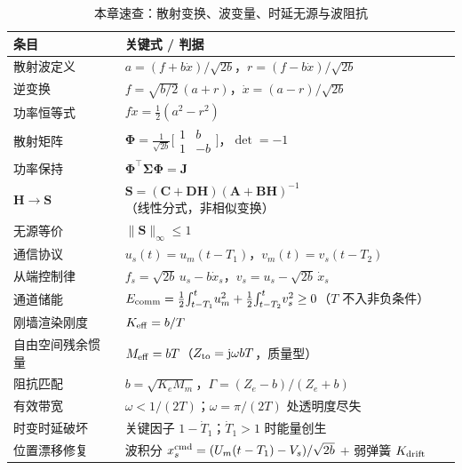 \begin{table}[H]\centering\small
\caption{本章速查：散射变换、波变量、时延无源与波阻抗}
\label{tab:tw-cheatsheet}
\begin{tabular}{p{} p{}}
\toprule
条目 & 关键式 / 判据 \\
\midrule
散射波定义 & $a=(f+b\dot x)/\sqrt{2b}$，$r=(f-b\dot x)/\sqrt{2b}$ \\
逆变换 & $f=\sqrt{b/2}\,(a+r)$，$\dot x=(a-r)/\sqrt{2b}$ \\
功率恒等式 & $f\dot x=\tfrac12(a^2-r^2)$ \\
散射矩阵 & $\boldsymbol\Phi=\tfrac1{\sqrt{2b}}\!\big[\begin{smallmatrix}1&b\\1&-b\end{smallmatrix}\big]$，$\det=-1$ \\
功率保持 & $\boldsymbol\Phi^\top\boldsymbol\Sigma\boldsymbol\Phi=\mathbf J$ \\
$\mathbf H\!\to\!\mathbf S$ & $\mathbf S=(\mathbf C+\mathbf D\mathbf H)(\mathbf A+\mathbf B\mathbf H)^{-1}$（线性分式，非相似变换） \\
无源等价 & $\|\mathbf S\|_\infty\le1$ \\
通信协议 & $u_s(t)=u_m(t-T_1)$，$v_m(t)=v_s(t-T_2)$ \\
从端控制律 & $f_s=\sqrt{2b}\,u_s-b\dot x_s$，$v_s=u_s-\sqrt{2b}\,\dot x_s$ \\
通道储能 & $E_{\rm comm}=\tfrac12\!\int_{t-T_1}^t\! u_m^2+\tfrac12\!\int_{t-T_2}^t\! v_s^2\ge0$（$T$ 不入非负条件） \\
刚墙渲染刚度 & $K_{\rm eff}=b/T$ \\
自由空间残余惯量 & $M_{\rm eff}=bT$（$Z_{\rm to}=\mathrm j\omega bT$，质量型） \\
阻抗匹配 & $b=\sqrt{K_eM_m}$，$\Gamma=(Z_e-b)/(Z_e+b)$ \\
有效带宽 & $\omega<1/(2T)$；$\omega=\pi/(2T)$ 处透明度尽失 \\
时变时延破坏 & 关键因子 $1-\dot T_1$；$\dot T_1>1$ 时能量创生 \\
位置漂移修复 & 波积分 $x_s^{\rm cmd}=(U_m(t-T_1)-V_s)/\sqrt{2b}$ $+$ 弱弹簧 $K_{\rm drift}$ \\
\bottomrule
\end{tabular}
\end{table}

